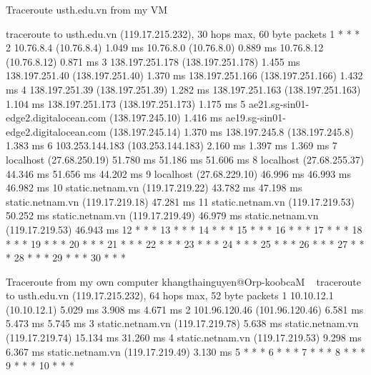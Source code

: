 Traceroute usth.edu.vn from my VM

traceroute to usth.edu.vn (119.17.215.232), 30 hops max, 60 byte packets
 1  * * *
 2  10.76.8.4 (10.76.8.4)  1.049 ms 10.76.8.0 (10.76.8.0)  0.889 ms 10.76.8.12 (10.76.8.12)  0.871 ms
 3  138.197.251.178 (138.197.251.178)  1.455 ms 138.197.251.40 (138.197.251.40)  1.370 ms 138.197.251.166 (138.197.251.166)  1.432 ms
 4  138.197.251.39 (138.197.251.39)  1.282 ms 138.197.251.163 (138.197.251.163)  1.104 ms 138.197.251.173 (138.197.251.173)  1.175 ms
 5  ae21.sg-sin01-edge2.digitalocean.com (138.197.245.10)  1.416 ms ae19.sg-sin01-edge2.digitalocean.com (138.197.245.14)  1.370 ms 138.197.245.8 (138.197.245.8)  1.383 ms
 6  103.253.144.183 (103.253.144.183)  2.160 ms  1.397 ms  1.369 ms
 7  localhost (27.68.250.19)  51.780 ms  51.186 ms  51.606 ms
 8  localhost (27.68.255.37)  44.346 ms  51.656 ms  44.202 ms
 9  localhost (27.68.229.10)  46.996 ms  46.993 ms  46.982 ms
10  static.netnam.vn (119.17.219.22)  43.782 ms  47.198 ms static.netnam.vn (119.17.219.18)  47.281 ms
11  static.netnam.vn (119.17.219.53)  50.252 ms static.netnam.vn (119.17.219.49)  46.979 ms static.netnam.vn (119.17.219.53)  46.943 ms
12  * * *
13  * * *
14  * * *
15  * * *
16  * * *
17  * * *
18  * * *
19  * * *
20  * * *
21  * * *
22  * * *
23  * * *
24  * * *
25  * * *
26  * * *
27  * * *
28  * * *
29  * * *
30  * * *


Traceroute from my own computer
khangthainguyen@Orp-koobcaM ~ %
traceroute to usth.edu.vn (119.17.215.232), 64 hops max, 52 byte packets
 1  10.10.12.1 (10.10.12.1)  5.029 ms  3.908 ms  4.671 ms
 2  101.96.120.46 (101.96.120.46)  6.581 ms  5.473 ms  5.745 ms
 3  static.netnam.vn (119.17.219.78)  5.638 ms
    static.netnam.vn (119.17.219.74)  15.134 ms  31.260 ms
 4  static.netnam.vn (119.17.219.53)  9.298 ms  6.367 ms
    static.netnam.vn (119.17.219.49)  3.130 ms
 5  * * *
 6  * * *
 7  * * *
 8  * * *
 9  * * *
10  * * *